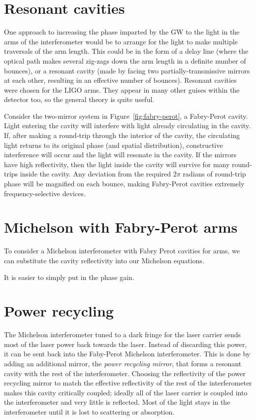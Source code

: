 \section{Resonant cavities}

One approach to increasing the phase imparted by the GW to the light
in the arms of the interferometer would be to arrange for the light to
make multiple traversals of the arm length.  This could be in the form
of a delay line (where the optical path makes several zig-zags down
the arm length in a definite number of bounces), or a resonant cavity
(made by facing two partially-transmissive mirrors at each other,
resulting in an effective number of bounces).  Resonant cavities were
chosen for the LIGO arms.  They appear in many other guises within the
detector too, so the general theory is quite useful.

Consider the two-mirror system in Figure~\ref{fig:fabry-perot}, a
Fabry-Perot cavity.  Light entering the cavity will interfere with
light already circulating in the cavity.  If, after making a
round-trip through the interior of the cavity, the circulating light
returns to its original phase (and spatial distribution), constructive
interference will occur and the light will resonate in the cavity.  If
the mirrors have high reflectivity, then the light inside the cavity
will survive for many round-trips inside the cavity. Any deviation from the
required $2\pi$ radians of round-trip phase will be magnified on each
bounce, making Fabry-Perot cavities extremely frequency-selective
devices.

\section{Michelson with Fabry-Perot arms}

To consider a Michelson interferometer with Fabry Perot cavities for
arms, we can substitute the cavity reflectivity into our Michelson
equations.

It is easier to simply put in the phase gain.

\section{Power recycling}

The Michelson interferometer tuned to a dark fringe for the laser
carrier sends most of the laser power back towards the laser.  Instead
of discarding this power, it can be sent back into the Faby-Perot
Michelson interferometer.  This is done by adding an additional
mirror, the \emph{power recycling mirror}, that forms a resonant
cavity with the rest of the interferometer.  Choosing the reflectivity
of the power recycling mirror to match the effective reflectivity of
the rest of the interferometer makes this cavity critically coupled;
ideally all of the laser carrier is coupled into the interferometer
and very little is reflected.  Most of the light stays in the
interferometer until it is lost to scattering or absorption.


